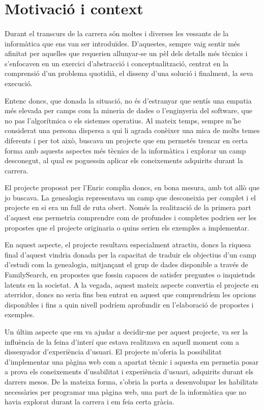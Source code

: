 \section{Motivació i context}

    \paragraph{}
    Durant el transcurs de la carrera són moltes i diverses les vessants de la informàtica que ens van ser introduïdes. D’aquestes, sempre vaig sentir més afinitat per aquelles que requerien allunyar-se un pèl dels detalls més tècnics i s'enfocaven en un exercici d’abstracció i conceptualització, centrat en la comprensió d’un problema quotidià, el disseny d’una solució i finalment, la seva execució.

    Entenc doncs, que donada la situació, no és d'estranyar que sentís una empatia més elevada per camps com la mineria de dades o l’enginyeria del software, que no pas l'algorítmica o els sistemes operatius. Al mateix temps, sempre m’he considerat una persona dispersa a qui li agrada conèixer una mica de molts temes diferents i per tot això, buscava un projecte que em permetés trencar en certa forma amb aquests aspectes més tècnics de la informàtica i explorar un camp desconegut, al qual es poguessin aplicar els coneixements adquirits durant la carrera.

    El projecte proposat per l’Enric complia doncs, en bona mesura, amb tot allò que jo buscava. La genealogia representava un camp que desconeixia per complet i el projecte en si era un full de ruta obert. Només la realització de la primera part d'aquest ens permetria comprendre com de profundes i completes podrien ser les propostes que el projecte originaria o quins serien els exemples a implementar.

    En aquest aspecte, el projecte resultava especialment atractiu, doncs la riquesa final d'aquest vindria donada per la capacitat de traduir els objectius d’un camp d’estudi com la genealogia, mitjançant el grup de dades disponible a través de Family\-Search, en propostes que fossin capaces de satisfer preguntes o inquietuds latents en la societat. A la vegada, aquest mateix aspecte convertia el projecte en aterridor, doncs no seria fins ben entrat en aquest que comprendríem les opcions disponibles i fins a quin nivell podríem aprofundir en l'elaboració de propostes i exemples.

    Un últim aspecte que em va ajudar a decidir-me per aquest projecte, va ser la influència de la feina d'interí que estava realitzava en aquell moment com a dissenyador d’experiència d’usuari. El projecte m’oferia la possibilitat d’implementar una pàgina web com a apartat tècnic i aquesta em permetia posar a prova els coneixements d’usabilitat i experiència d’usuari, adquirits durant els darrers mesos. De la mateixa forma, s'obria la porta a desenvolupar les habilitats necessàries per programar una pàgina web, una part de la informàtica que no havia explorat durant la carrera i em feia certa gràcia.
